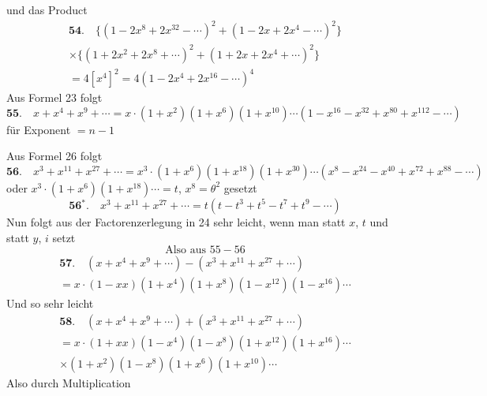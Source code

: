 \documentclass[10pt,a4paper]{article}
\begin{document}
\newpage

und das Product
%
\begin{multline*}
\textbf{54.} \quad
\bigl\{(1 - 2x^8 + 2x^{32} - \cdots)^2 + (1 - 2x + 2x^4 - \cdots)^2\bigr\} \\
\times \bigl\{(1 + 2x^2 + 2x^8 + \cdots)^2 + (1 + 2x + 2x^4 + \cdots)^2\bigr\} \\
= 4[x^4]^2 = 4(1 - 2x^4 + 2x^{16} - \cdots)^4
\end{multline*}
%
Aus Formel 23 folgt
%
\begin{equation*}
\textbf{55.} \quad x + x^4 + x^9 + \cdots = x \cdot (1 + x^2)(1 + x^6)(1 + x^{10}) \cdots (1 - x^{16} - x^{32} + x^{80} + x^{112} - \cdots)
\end{equation*}
%
f\"ur Exponent $= n - 1$

Aus Formel 26 folgt
%
\begin{equation*}
\textbf{56.} \quad x^3 + x^{11} + x^{27} + \cdots = x^3 \cdot (1 + x^6)(1 + x^{18})(1 + x^{30}) \cdots (x^8 - x^{24} - x^{40} + x^{72} + x^{88} - \cdots)
\end{equation*}
%
oder $x^3 \cdot (1 + x^6)(1 + x^{18}) \cdots = t$, $x^8 = \theta^2$ gesetzt
%
\begin{equation*}
\textbf{56$^*$.} \quad x^3 + x^{11} + x^{27} + \cdots = t(t - t^3 + t^5 - t^7 + t^9 - \cdots)
\end{equation*}
%
Nun folgt aus der Factorenzerlegung in 24 sehr leicht, wenn man statt $x$, $t$ und statt $y$, $i$ setzt
%
\begin{equation*}
\text{Also aus } 55 - 56
\end{equation*}
%
\begin{multline*}
\textbf{57.} \quad (x + x^4 + x^9 + \cdots) - (x^3 + x^{11} + x^{27} + \cdots) \\
= x \cdot (1 - xx)(1 + x^4)(1 + x^8)(1 - x^{12})(1 - x^{16}) \cdots
\end{multline*}
%
Und so sehr leicht
%
\begin{multline*}
\textbf{58.} \quad (x + x^4 + x^9 + \cdots) + (x^3 + x^{11} + x^{27} + \cdots) \\
= x \cdot (1 + xx)(1 - x^4)(1 - x^8)(1 + x^{12})(1 + x^{16}) \cdots \\
\times (1 + x^2)(1 - x^8)(1 + x^6)(1 + x^{10}) \cdots
\end{multline*}
%
Also durch Multiplication

\newpage
\end{document}
